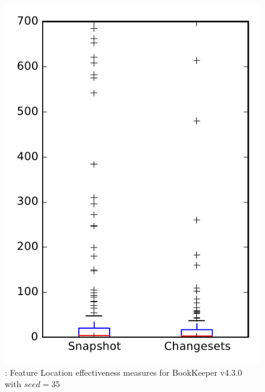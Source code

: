 
\begin{figure}
\centering
\includegraphics[height=0.4\textheight]{figures/flt_seed/rq1_bookkeeper_35}
\caption{\rone: Feature Location effectiveness measures for BookKeeper v4.3.0 with $seed=35$}
\label{fig:flt_seed:rq1:bookkeeper}
\end{figure}

